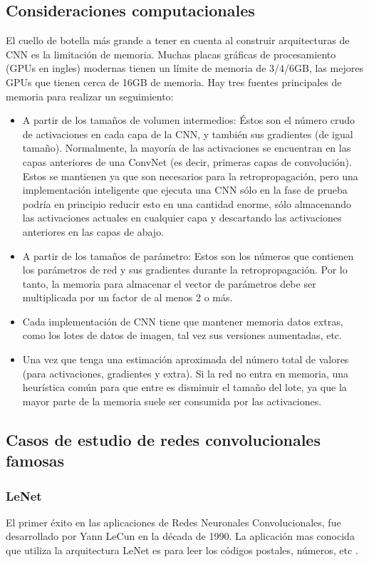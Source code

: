 \documentclass[a4paper,11pt,spanish]{book}
\begin{document}
    \subsection {Consideraciones computacionales}
      El cuello de botella más grande a tener en cuenta al construir arquitecturas de CNN es la limitación de memoria.
      Muchas placas gráficas de procesamiento (GPUs en ingles) modernas tienen un límite de memoria de 3/4/6GB, las mejores GPUs que tienen cerca de 16GB de memoria.
      Hay tres fuentes principales de memoria para realizar un seguimiento:
      \begin{itemize}
	\item A partir de los tamaños de volumen intermedios: Éstos son el número crudo de activaciones en cada capa de la CNN, y también sus gradientes (de igual tamaño).
	  Normalmente, la mayoría de las activaciones se encuentran en las capas anteriores de una ConvNet (es decir, primeras capas de convolución).
	  Estos se mantienen ya que son necesarios para la retropropagación, pero una implementación inteligente que ejecuta una CNN sólo en la fase de prueba podría
	  en principio reducir esto en una cantidad enorme, sólo almacenando las activaciones actuales en cualquier capa y descartando las activaciones anteriores
	  en las capas de abajo.
	\item A partir de los tamaños de parámetro: Estos son los números que contienen los parámetros de red y sus gradientes durante la retropropagación.
	  Por lo tanto, la memoria para almacenar el vector de parámetros debe ser multiplicada por un factor de al menos 2 o más.
	\item Cada implementación de CNN tiene que mantener memoria datos extras, como los lotes de datos de imagen, tal vez sus versiones aumentadas, etc.
	\item Una vez que tenga una estimación aproximada del número total de valores (para activaciones, gradientes y extra). Si la red no entra en memoria, una heurística común
	  para que entre es disminuir el tamaño del lote, ya que la mayor parte de la memoria suele ser consumida por las activaciones.
      \end{itemize}


    \subsection {Casos de estudio de redes convolucionales famosas}

      \subsubsection{LeNet}
	 El primer éxito en las aplicaciones de Redes Neuronales Convolucionales, fue desarrollado por Yann LeCun en la década de 1990. La aplicación mas conocida que utiliza la arquitectura
	 LeNet es para leer los códigos postales, números, etc \cite{Lecun:LeNet}.
\end{document}
